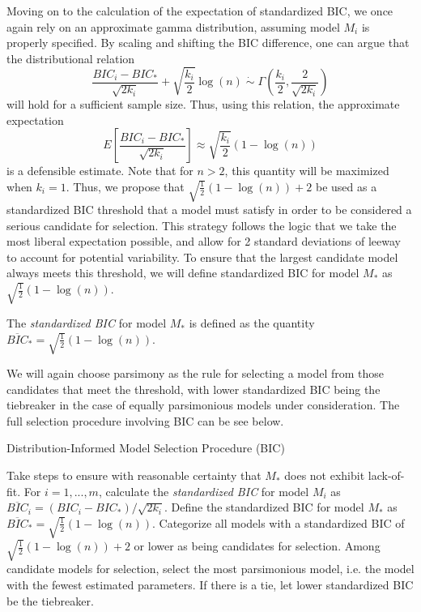 		Moving on to the calculation of the expectation of standardized BIC, we once again rely on an approximate gamma distribution, assuming model $M_i$ is properly specified.
		By scaling and shifting the BIC difference, one can argue that the distributional relation
		\begin{equation*}
			\frac{BIC_i - BIC_*}{\sqrt{2k_i}} + \sqrt{\frac{k_i}{2}} \log(n) \; \dot\sim \; \Gamma \left( \frac{k_i}{2}, \frac{2}{\sqrt{2k_i}} \right)
		\end{equation*}
		will hold for a sufficient sample size. Thus, using this relation, the approximate expectation
		\begin{equation*}
			E \left[ \frac{BIC_i - BIC_*}{\sqrt{2k_i}} \right] \approx \sqrt{\frac{k_i}{2}} (1-\log(n))
		\end{equation*}
		is a defensible estimate. Note that for $n > 2$, this quantity will be maximized when $k_i = 1$. Thus, we propose that $\sqrt{\frac{1}{2}} (1-\log(n)) + 2$ be used as a
		standardized BIC threshold that a model must satisfy
		in order to be considered a serious candidate for selection. This strategy follows the logic that we take the most liberal expectation possible, and allow for 2 standard
		deviations of leeway to account for potential variability. To ensure that the largest candidate model always meets this threshold, we will define standardized BIC
		for model $M_*$ as $\sqrt{\frac{1}{2}} (1-\log(n))$.
		\begin{definition}
			The \textit{standardized BIC} for model $M_*$ is defined as the quantity $\overline{BIC}_* = \sqrt{\frac{1}{2}} (1-\log(n))$.
		\end{definition}
		
		We will again choose parsimony as the rule for selecting a model from those candidates that meet the threshold, with lower standardized BIC being the tiebreaker in the
		case of equally parsimonious models under consideration. The full selection procedure involving BIC can be see below.
		\begin{algorithm}[H]
			\caption{Distribution-Informed Model Selection Procedure (BIC)}
			\begin{algorithmic}[1]
			  \State Take steps to ensure with reasonable certainty that $M_*$ does not exhibit lack-of-fit.
			  \State For $i = 1,...,m$, calculate the \textit{standardized BIC} for model $M_i$ as 
			  $\overline{BIC}_i = (BIC_i - BIC_*) / \sqrt{2k_i}$. Define the standardized BIC for model
			  $M_*$ as $\overline{BIC}_* = \sqrt{\frac{1}{2}} (1-\log(n))$.
			  \State Categorize all models with a standardized BIC of $\sqrt{\frac{1}{2}} (1-\log(n)) + 2$ or lower as
			  being candidates for selection.
			  \State Among candidate models for selection, select the most parsimonious model, i.e. the model
			  with the fewest estimated parameters. If there is a tie, let lower standardized BIC be the
			  tiebreaker.
			\end{algorithmic}
		\end{algorithm}

